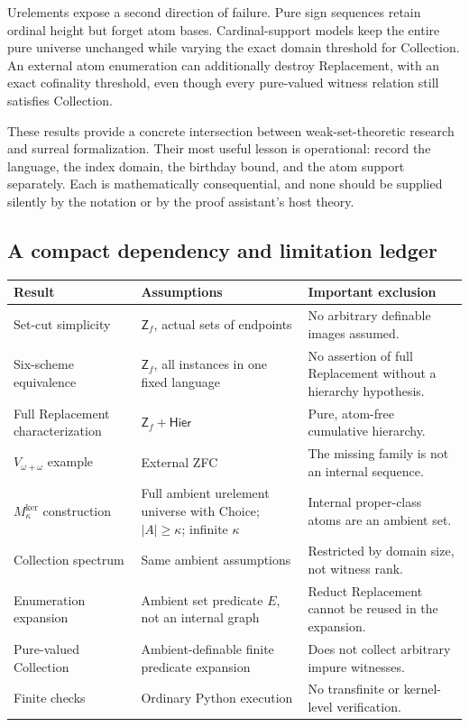 \documentclass[11pt,letterpaper]{article}
\theoremstyle{definition}
\theoremstyle{remark}
\newcommand{\Zf}{\mathsf{Z}_{\!f}}
\newcommand{\Hier}{\mathsf{Hier}}
\newcommand{\Mker}{M^{\mathrm{ker}}}
\begin{document}
Urelements expose a second direction of failure. Pure sign sequences retain ordinal height but forget atom bases. Cardinal-support models keep the entire pure universe unchanged while varying the exact domain threshold for Collection. An external atom enumeration can additionally destroy Replacement, with an exact cofinality threshold, even though every pure-valued witness relation still satisfies Collection.

These results provide a concrete intersection between weak-set-theoretic research and surreal formalization. Their most useful lesson is operational: record the language, the index domain, the birthday bound, and the atom support separately. Each is mathematically consequential, and none should be supplied silently by the notation or by the proof assistant's host theory.

\subsection{A compact dependency and limitation ledger}
\begin{center}
\small
\begin{tabularx}{\textwidth}{@{}P{0.34\textwidth}YY@{}}
\toprule
Result & Assumptions & Important exclusion \\
\midrule
Set-cut simplicity & $\Zf$, actual sets of endpoints & No arbitrary definable images assumed. \\
Six-scheme equivalence & $\Zf$, all instances in one fixed language & No assertion of full Replacement without a hierarchy hypothesis. \\
Full Replacement characterization & $\Zf+\Hier$ & Pure, atom-free cumulative hierarchy. \\
$V_{\omega+\omega}$ example & External ZFC & The missing family is not an internal sequence. \\
$\Mker_\kappa$ construction & Full ambient urelement universe with Choice; $|A|\geq\kappa$; infinite $\kappa$ & Internal proper-class atoms are an ambient set. \\
Collection spectrum & Same ambient assumptions & Restricted by domain size, not witness rank. \\
Enumeration expansion & Ambient set predicate $E$, not an internal graph & Reduct Replacement cannot be reused in the expansion. \\
Pure-valued Collection & Ambient-definable finite predicate expansion & Does not collect arbitrary impure witnesses. \\
Finite checks & Ordinary Python execution & No transfinite or kernel-level verification. \\
\bottomrule
\end{tabularx}
\end{center}
\end{document}
